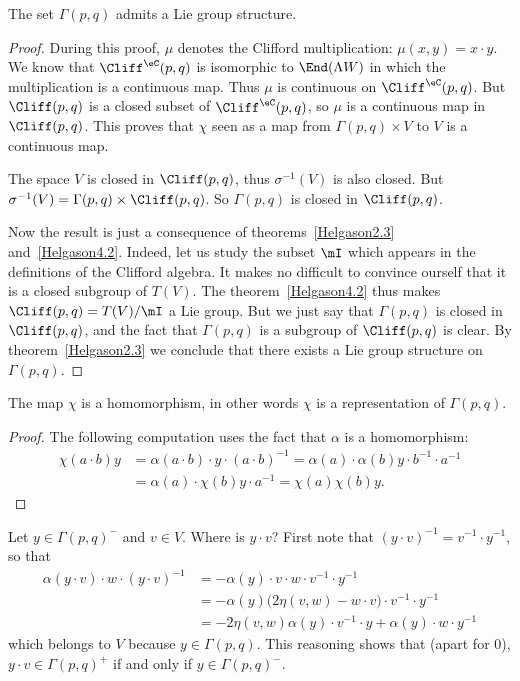 \begin{proposition}
The set $\Gamma(p,q)$ admits a Lie group structure.
\end{proposition}
\begin{proof}

During this proof, $\mu$ denotes the Clifford multiplication: $\mu(x,y)=x\cdot y$. We know that $\Cliff^{\eC}(p,q)$ is isomorphic to $\End(\Lambda W)$ in which the multiplication is a continuous map. Thus $\mu$ is continuous on $\Cliff^{\eC}(p,q)$. But $\Cliff(p,q)$ is a closed subset of $\Cliff^{\eC}(p,q)$, so $\mu$ is a continuous map in $\Cliff(p,q)$. This proves that  $\chi$ seen as a map from $\Gamma(p,q)\times V$ to $V$ is a continuous map.

The space $V$ is closed in $\Cliff(p,q)$, thus $\sigma^{-1}(V)$ is also closed. But $\sigma^{-1}(V)=\Gamma(p,q)\times\Cliff(p,q)$. So $\Gamma(p,q)$ is closed in $\Cliff(p,q)$.

Now the result is just a consequence of theorems~\ref{Helgason2.3} and~\ref{Helgason4.2}. Indeed, let us study the subset $\mI$ which appears in the definitions of the Clifford algebra. It makes no difficult to convince ourself that it is a closed subgroup of $T(V)$. The theorem~\ref{Helgason4.2} thus makes $\Cliff(p,q)=T(V)/\mI$ a Lie group. But we just say that $\Gamma(p,q)$ is closed in $\Cliff(p,q)$, and the fact that $\Gamma(p,q)$ is a subgroup of $\Cliff(p,q)$ is clear. By theorem~\ref{Helgason2.3} we conclude that there exists a Lie group structure on $\Gamma(p,q)$.
\end{proof}

\begin{lemma}
The map $\chi$ is a homomorphism, in other words $\chi$ is a representation of $\Gamma(p,q)$.
\end{lemma}

\begin{proof}
The following computation uses the fact that $\alpha$ is a homomorphism:
\[
\begin{split}
\chi(a\cdot b)y&=\alpha(a\cdot b)\cdot y\cdot (a\cdot b)^{-1}
               =\alpha(a)\cdot\alpha(b)y\cdot b^{-1}\cdot a^{-1}\\
               &=\alpha(a)\cdot\chi(b)y\cdot a^{-1}
               =\chi(a)\chi(b)y.
\end{split}
\]
\end{proof}
Let $y\in\Gamma(p,q)^-$ and $v\in V$. Where is $y\cdot v$? First note that $(y\cdot v)^{-1}=v^{-1}\cdot y^{-1}$, so that
\begin{equation}
\begin{split}
  \alpha(y\cdot v)\cdot w\cdot(y\cdot v)^{-1}&=-\alpha(y)\cdot v\cdot w\cdot v^{-1}\cdot y^{-1}\\
                                            &=-\alpha(y)\big( 2\eta(v,w)-w\cdot v \big)\cdot v^{-1}\cdot y^{-1}\\
					    &=-2\eta(v,w)\alpha(y)\cdot v^{-1}\cdot y+\alpha(y)\cdot w\cdot y^{-1}
\end{split}
\end{equation}
which belongs to $V$ because $y\in\Gamma(p,q)$. This reasoning shows that (apart for $0$), $y\cdot v\in\Gamma(p,q)^+$ if and only if $y\in\Gamma(p,q)^-$.


